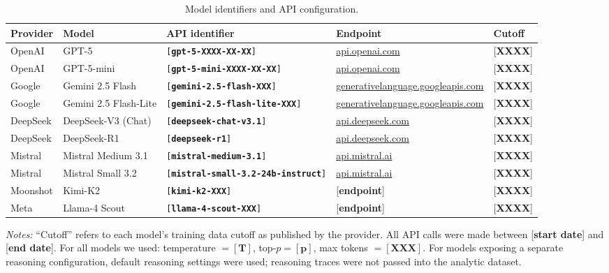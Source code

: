 \documentclass[12pt]{article}
\begin{document}
\begin{table}[h]
    \centering
    \caption{Model identifiers and API configuration.}
    \label{tab:model-ids-detail}
    \begin{threeparttable}
    \footnotesize
    \begin{tabular}{lllll}
        \toprule
        Provider & Model & API identifier & Endpoint & Cutoff \\
        \midrule
        OpenAI    & GPT-5                & \texttt{[\textbf{gpt-5-XXXX-XX-XX}]}                & \url{api.openai.com}     & [\textbf{XXXX}] \\
        OpenAI    & GPT-5-mini           & \texttt{[\textbf{gpt-5-mini-XXXX-XX-XX}]}           & \url{api.openai.com}     & [\textbf{XXXX}] \\
        Google    & Gemini 2.5 Flash     & \texttt{[\textbf{gemini-2.5-flash-XXX}]}            & \url{generativelanguage.googleapis.com} & [\textbf{XXXX}] \\
        Google    & Gemini 2.5 Flash-Lite & \texttt{[\textbf{gemini-2.5-flash-lite-XXX}]}      & \url{generativelanguage.googleapis.com} & [\textbf{XXXX}] \\
        DeepSeek  & DeepSeek-V3 (Chat)   & \texttt{[\textbf{deepseek-chat-v3.1}]}              & \url{api.deepseek.com}   & [\textbf{XXXX}] \\
        DeepSeek  & DeepSeek-R1          & \texttt{[\textbf{deepseek-r1}]}                     & \url{api.deepseek.com}   & [\textbf{XXXX}] \\
        Mistral   & Mistral Medium 3.1   & \texttt{[\textbf{mistral-medium-3.1}]}              & \url{api.mistral.ai}     & [\textbf{XXXX}] \\
        Mistral   & Mistral Small 3.2    & \texttt{[\textbf{mistral-small-3.2-24b-instruct}]}  & \url{api.mistral.ai}     & [\textbf{XXXX}] \\
        Moonshot  & Kimi-K2              & \texttt{[\textbf{kimi-k2-XXX}]}                     & [\textbf{endpoint}]      & [\textbf{XXXX}] \\
        Meta      & Llama-4 Scout        & \texttt{[\textbf{llama-4-scout-XXX}]}               & [\textbf{endpoint}]      & [\textbf{XXXX}] \\
        \bottomrule
    \end{tabular}
    \begin{tablenotes}\footnotesize
        \item \textit{Notes:} ``Cutoff'' refers to each model's training data cutoff as published by the provider. All API calls were made between [\textbf{start date}] and [\textbf{end date}]. For all models we used: temperature $= [\textbf{T}]$, top-$p = [\textbf{p}]$, max tokens $= [\textbf{XXX}]$. For models exposing a separate reasoning configuration, default reasoning settings were used; reasoning traces were not passed into the analytic dataset.
    \end{tablenotes}
    \end{threeparttable}
\end{table}
\end{document}

